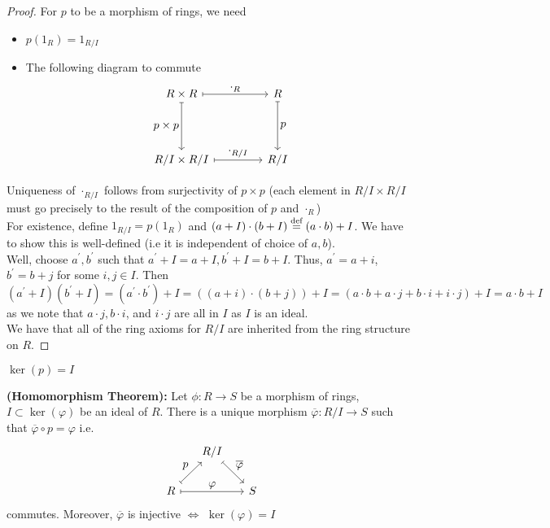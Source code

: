\begin{proof}
    For $p$ to be a morphism of rings, we need
    \begin{itemize}
        \item $p(1_R) = 1_{R/I}$
        \item The following diagram to commute
        \[ \begin{tikzcd}[%
        ,every arrow/.append style={maps to}
        ,every label/.append style={font=\normalsize}
        ,row sep=1.5cm
        ,column sep=1.5cm]
        R \times R \arrow{r}{\cdot_R} \arrow[swap]{d}{p \times p} & R \arrow{d}{p} \\%
        R/I \times R/I \arrow{r}{\cdot_{R/I}}& R/I
        \end{tikzcd}
        \]
    \end{itemize}
    Uniqueness of $\cdot_{R/I}$ follows from surjectivity of $p \times p$ (each element
    in $R / I \times R/I$ must go precisely to the result of the composition of $p$ and
    $\cdot_R$) \\
    For existence, define $1_{R/I} = p(1_R)$ and $(a + I) \cdot (b + I) \overset{\textrm{def}}{=} (a \cdot b) + I$.
    We have to show this is well-defined (i.e it is independent of choice of $a, b$). \\
    Well, choose $a^\prime, b^\prime$ such that $a^\prime  + I = a + I, b^\prime + I = b + I$.
    Thus, $a^\prime = a + i$, $b^\prime = b + j$ for some $i, j \in I$. Then
    $$
    (a^\prime + I)(b^\prime + I) = (a^\prime \cdot b^\prime) + I = ((a + i)\cdot(b + j)) + I =
    (a\cdot b + a \cdot j + b \cdot i + i \cdot j) + I = a\cdot b + I
    $$
    as we note that $a \cdot j, b \cdot i$, and $i \cdot j$ are all in $I$ as $I$
    is an ideal. \\
    We have that all of the ring axioms for $R / I$ are inherited from the ring
    structure on $R$.
\end{proof}
\begin{rmk}
    $\ker(p) = I$
\end{rmk}
\begin{thm}\label{Thm 3, Jan 6} \textbf{(Homomorphism Theorem):}
    Let $\phi: R \rightarrow S$ be a morphism of rings, $I \subset \ker(\varphi)$ be
    an ideal of $R$. There is a unique morphism $\overline{\varphi}: R/I \rightarrow S$
    such that $\overline{\varphi} \circ p = \varphi$ i.e.
    \[
\begin{tikzcd}[,every arrow/.append style={maps to}
,every label/.append style={font=\normalsize},column sep=1.5em]
 & R/I \arrow{dr}{\overline{\varphi}} \\
R \arrow{ur}{p} \arrow{rr}{\varphi} && S
\end{tikzcd}
\]
commutes. Moreover, $\overline{\varphi}$ is injective $\iff$ $\ker(\varphi) = I$
\end{thm}
